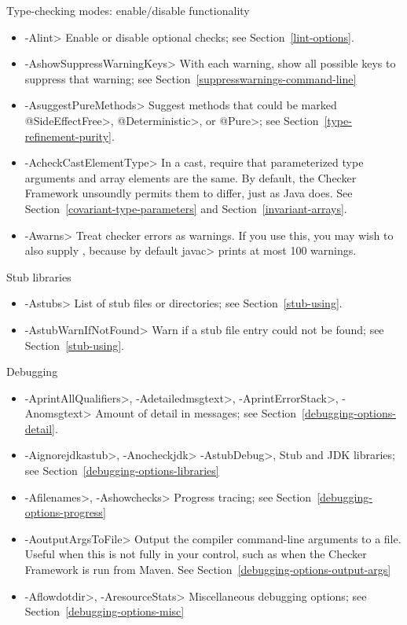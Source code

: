 Type-checking modes:  enable/disable functionality
\begin{itemize}
\item \<-Alint>
  Enable or disable optional checks; see Section~\ref{lint-options}.
\item \<-AshowSuppressWarningKeys>
  With each warning, show all possible keys to suppress that warning;
  see Section~\ref{suppresswarnings-command-line}
\item \<-AsuggestPureMethods>
  Suggest methods that could be marked \<@SideEffectFree>,
  \<@Deterministic>, or \<@Pure>; see Section~\ref{type-refinement-purity}.
\item \<-AcheckCastElementType>
  In a cast, require that parameterized type arguments and array elements
  are the same.  By default, the Checker Framework unsoundly permits them
  to differ, just as Java does.  See Section~\ref{covariant-type-parameters}
  and Section~\ref{invariant-arrays}.
\item \<-Awarns>
  Treat checker errors as warnings.  If you use this, you
  may wish to also supply , because by default
  \<javac> prints at most 100 warnings.
\end{itemize}

Stub libraries
\begin{itemize}
\item \<-Astubs>
  List of stub files or directories; see Section~\ref{stub-using}.
\item \<-AstubWarnIfNotFound>
  Warn if a stub file entry could not be found; see Section~\ref{stub-using}.
\end{itemize}

Debugging
\begin{itemize}
\item
 \<-AprintAllQualifiers>,
 \<-Adetailedmsgtext>,
 \<-AprintErrorStack>,
 \<-Anomsgtext>
Amount of detail in messages; see Section~\ref{debugging-options-detail}.

\item
 \<-Aignorejdkastub>,
 \<-Anocheckjdk>
 \<-AstubDebug>,
Stub and JDK libraries; see Section~\ref{debugging-options-libraries}

\item
 \<-Afilenames>,
 \<-Ashowchecks>
Progress tracing; see Section~\ref{debugging-options-progress}

\item
\<-AoutputArgsToFile>
Output the compiler command-line arguments to a file.  Useful when this is not
fully in your control, such as when the Checker Framework is run from Maven.
See Section~\ref{debugging-options-output-args}

\item
 \<-Aflowdotdir>,
 \<-AresourceStats>
Miscellaneous debugging options; see Section~\ref{debugging-options-misc}
\end{itemize}


